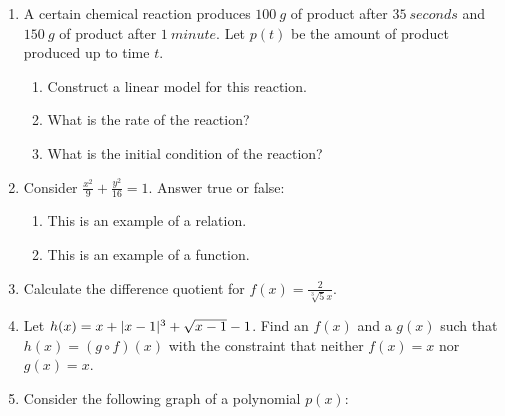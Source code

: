 \documentclass[letterpaper,12pt,fleqn]{article}
\begin{document}
\begin{enumerate}
\item A certain chemical reaction produces $\SI{100}{g}$ of product after
  $\SI{35}{seconds}$ and $\SI{150}{g}$ of product after $\SI{1}{minute}$.
  Let $p(t)$ be the amount of product produced up to time $t$.
  \begin{enumerate}
  \item Construct a linear model for this reaction.

    \vspace{2.5in}
    
  \item What is the rate of the reaction?

    \vspace{1in}

  \item What is the initial condition of the reaction?
    
  \end{enumerate}

  \newpage

\item Consider $\frac{x^2}{9}+\frac{y^2}{16}=1$. Answer true or false:
  \begin{enumerate}
  \item This is an example of a relation.
    
    \bigskip

  \item This is an example of a function.
  \end{enumerate}

  \bigskip

\item Calculate the difference quotient for $f(x)=\frac{2}{\sqrt[3]{5}x}$.

  \vspace{4in}

\item Let $h(x)=x+\lvert x-1\rvert^3+\sqrt{x-1}-1$. Find an $f(x)$ and a $g(x)$ such
  that $h(x)=(g\circ f)(x)$ with the constraint that neither $f(x)=x$ nor
  $g(x)=x$.

  \newpage
  
\item Consider the following graph of a polynomial $p(x)$:



\end{enumerate}
\end{document}
